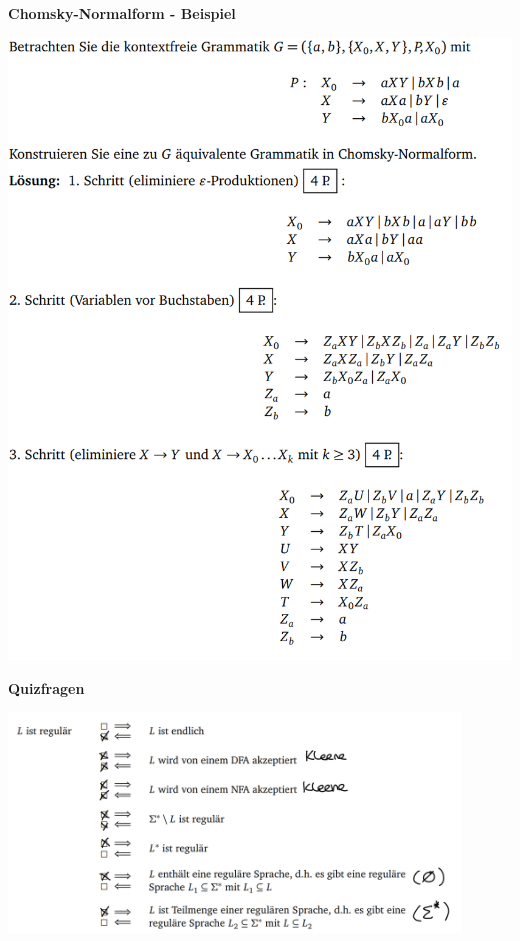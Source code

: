 \documentclass[11pt,a4paper]{article}
\begin{document}
{\pagebreak

{\Large \textbf{Chomsky-Normalform - Beispiel}

\begin{center}
\includegraphics[scale=1]{chomskybsp}
\end{center}

\pagebreak

{\Large \textbf{Quizfragen}}

\begin{center}
\includegraphics[width=12cm]{quiz1}
\end{center}

}}
\end{document}
